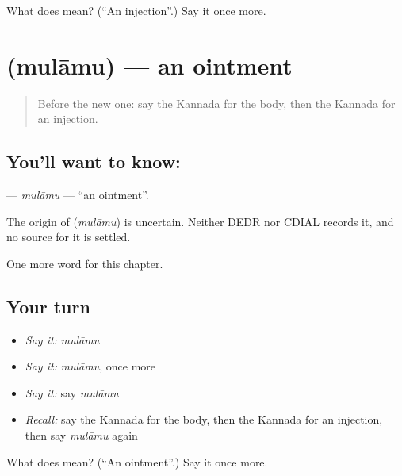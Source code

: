 \begin{tcolorbox}[breakable,colback=teal!4,colframe=teal!35!black,title={Before you move on}]
What does  mean? (\textquotedblleft{}An injection\textquotedblright{}.) Say it once more.
\end{tcolorbox}
\section[\texorpdfstring{\kn{ಮುಲಾಮು} (mulāmu)}{ಮುಲಾಮು (mulāmu)}]{ (mulāmu) — an ointment}

\label{lesson:KA-C208-mulamu}



\begin{quote}
Before the new one: say the Kannada for the body, then the Kannada for an injection.
\end{quote}

\subsection*{You'll want to know: }
\textbf{} — \emph{mulāmu} — \textquotedblleft{}an ointment\textquotedblright{}.

\begin{cousinweb}
The origin of \textbf{} (\emph{mulāmu}) is uncertain. Neither DEDR nor CDIAL records it, and no source for it is settled.
\end{cousinweb}

\begin{grammarlens}[title={What you've built}]
One more word for this chapter.
\end{grammarlens}

\subsection*{Your turn}
\begin{itemize}
\raggedright
  \item \emph{Say it:} \emph{mulāmu}
  \item \emph{Say it:} \emph{mulāmu}, once more
  \item \emph{Say it:} say \emph{mulāmu}
  \item \emph{Recall:} say the Kannada for the body, then the Kannada for an injection, then say \emph{mulāmu} again
\end{itemize}

\begin{tcolorbox}[breakable,colback=teal!4,colframe=teal!35!black,title={Before you move on}]
What does  mean? (\textquotedblleft{}An ointment\textquotedblright{}.) Say it once more.
\end{tcolorbox}
